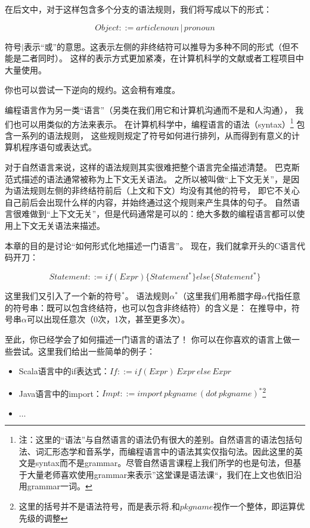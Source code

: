\documentclass[../main.tex]{subfiles}
\begin{document}
    \indent 在后文中，对于这样包含多个分支的语法规则，我们将写成以下的形式：

    $$Object ::= article noun\,|\,pronoun$$

    \indent 符号$|$表示“或”的意思。这表示左侧的非终结符可以推导为多种不同的形式（但不能是二者同时）。
    这样的表示方式更加紧凑，在计算机科学的文献或者工程项目中大量使用。

    \indent 你也可以尝试一下逆向的规约。这会稍有难度。
    \newline
  
  \indent 编程语言作为另一类“语言”（另类在我们用它和计算机沟通而不是和人沟通），
  我们也可以用类似的方法来表示。
  在计算机科学中，编程语言的语法（syntax）\footnote[1]{注：这里的“语法”与自然语言的语法仍有很大的差别。自然语言的语法包括句法、词汇形态学和音系学\cite{grammar}，而编程语言中的语法其实仅指句法。因此这里的英文是syntax而不是grammar。尽管自然语言课程上我们所学的也是句法，但基于大量老师喜欢使用grammar来表示”这堂课是语法课“，我们在上文也依旧沿用grammar一词。}
  包含一系列的语法规则，
  这些规则规定了符号如何进行排列，从而得到有意义的计算机程序语句或表达式。\cite{syntaxwiki}
  
  \indent 对于自然语言来说，这样的语法规则其实很难把整个语言完全描述清楚。
  巴克斯范式描述的语法通常被称为上下文无关语法。
  之所以被叫做“上下文无关”，是因为语法规则左侧的非终结符前后（上文和下文）均没有其他的符号，
  即它不关心自己前后会出现什么样的内容，并始终通过这个规则来产生具体的句子。
  自然语言很难做到“上下文无关”，但是代码通常是可以的：绝大多数的编程语言都可以使用上下文无关语法来描述。\cite{cfgwiki}

  \indent 本章的目的是讨论“如何形式化地描述一门语言”。
  现在，我们就拿开头的C语言代码开刀：

  $$
  Statement ::= if(Expr)\{ Statement^*\} else\{Statement^*\}
  $$

  \indent 这里我们又引入了一个新的符号${}^*$。
  语法规则$\alpha^*$（这里我们用希腊字母$\alpha$代指任意的符号串：既可以包含终结符，也可以包含非终结符）的含义是：
  在推导中，符号串$\alpha$可以出现任意次（0次，1次，甚至更多次）。

  \indent 至此，你已经学会了如何描述一门语言的语法了！
  你可以在你喜欢的语言上做一些尝试。这里我们给出一些简单的例子：

  \begin{itemize}
    \item Scala语言中的if表达式：$If ::= if(Expr)\,Expr\,else\,Expr$
    \item Java语言中的import：$Impt ::= import\,pkgname\,(dot\,pkgname)^*$\footnote[1]{这里的括号并不是语法符号，而是表示将$.$和$pkgname$视作一个整体，即运算优先级的调整}
    \item $\dots$
  \end{itemize}
\end{document}
